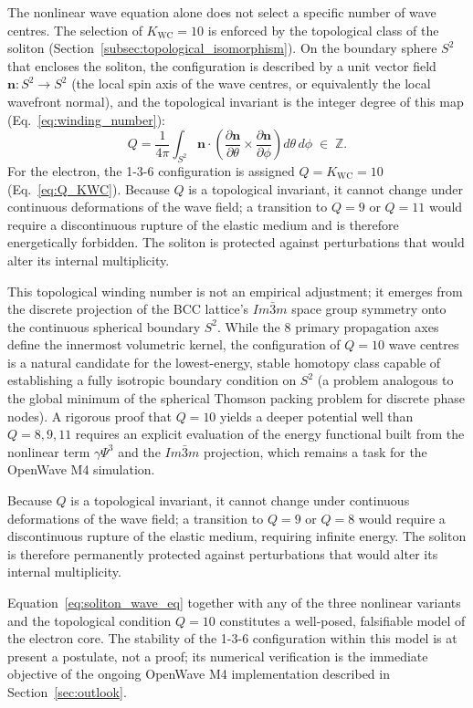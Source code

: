 \documentclass[10pt,a4paper]{article}
\begin{document}
The nonlinear wave equation alone does not select a specific number of
wave centres. The selection of $K_{\text{WC}}=10$ is enforced by the
topological class of the soliton
(Section~\ref{subsec:topological_isomorphism}). On the boundary
sphere $S^2$ that encloses the soliton, the configuration is described
by a unit vector field $\mathbf{n}: S^2 \to S^2$ (the local spin axis
of the wave centres, or equivalently the local wavefront normal), and
the topological invariant is the integer degree of this map
(Eq.~\ref{eq:winding_number}):
\begin{equation}
	Q = \frac{1}{4\pi} \int_{S^2}
	\mathbf{n} \cdot
	\left(
	\frac{\partial \mathbf{n}}{\partial \theta}
	\times
	\frac{\partial \mathbf{n}}{\partial \phi}
	\right)
	d\theta\, d\phi
	\;\in\; \mathbb{Z}.
\end{equation}
For the electron, the 1-3-6 configuration is assigned
$Q = K_{\text{WC}} = 10$ (Eq.~\ref{eq:Q_KWC}). Because $Q$ is a
topological invariant, it cannot change under continuous deformations
of the wave field; a transition to $Q=9$ or $Q=11$ would require a
discontinuous rupture of the elastic medium and is therefore
energetically forbidden. The soliton is protected against perturbations
that would alter its internal multiplicity.

This topological winding number is not an empirical adjustment; it emerges
from the discrete projection of the BCC lattice's $Im\bar{3}m$ space group symmetry
onto the continuous spherical boundary $S^2$. While the 8 primary propagation axes
define the innermost volumetric kernel, the configuration of $Q=10$ wave centres
is a natural candidate for the lowest-energy, stable homotopy class capable of
establishing a fully isotropic boundary condition on $S^2$ (a problem analogous
to the global minimum of the spherical Thomson packing problem for discrete phase
nodes).  A rigorous proof that $Q=10$ yields a deeper potential well than
$Q=8,9,11$ requires an explicit evaluation of the energy functional built from
the nonlinear term $\gamma\Psi^{3}$ and the $Im\bar{3}m$ projection, which
remains a task for the OpenWave M4 simulation.

Because $Q$ is a topological invariant, it cannot change under continuous
deformations of the wave field; a transition to $Q=9$ or $Q=8$ would require
a discontinuous rupture of the elastic medium, requiring infinite energy.
The soliton is therefore permanently protected against perturbations that would
alter its internal multiplicity.

Equation~\eqref{eq:soliton_wave_eq} together with any of the three nonlinear
variants and the topological condition $Q=10$ constitutes a well-posed,
falsifiable model of the electron core.  The stability of the 1-3-6
configuration within this model is at present a postulate, not a proof; its
numerical verification is the immediate objective of the ongoing OpenWave
M4 implementation described in Section~\ref{sec:outlook}.
\end{document}
